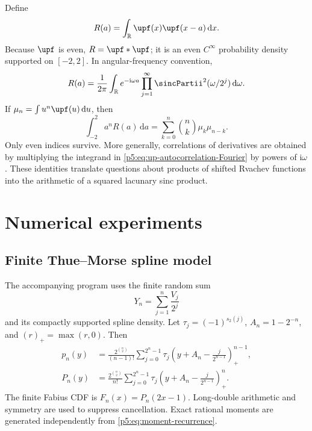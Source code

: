 \documentclass[11pt,oneside]{article}
\theoremstyle{definition}
\theoremstyle{remark}
\newcommand{\R}{\mathbb R}
\newcommand{\dd}{\,\mathrm d}
\newcommand{\ii}{\mathrm i}
\newcommand{\1}{\mathbf 1}
\begin{document}
Define
\begin{equation}\label{p5:eq:up-autocorrelation}
 R(a)=\int_{\R}\upf(x)\upf(x-a)\dd x.
\end{equation}
Because $\upf$ is even, $R=\upf*\upf$; it is an even $C^\infty$ probability density supported on $[-2,2]$.  In angular-frequency convention,
\begin{equation}\label{p5:eq:up-autocorrelation-Fourier}
 R(a)=\frac1{2\pi}\int_{\R}e^{-\ii\omega a}
 \prod_{j=1}^{\infty}\sincPartii^2(\omega/2^j)\dd\omega.
\end{equation}
If $\mu_n=\int u^n\upf(u)\dd u$, then
\begin{equation}\label{p5:eq:autocorrelation-moments}
 \int_{-2}^{2}a^nR(a)\dd a
 =\sum_{k=0}^n\binom nk\mu_k\mu_{n-k}.
\end{equation}
Only even indices survive.  More generally, correlations of derivatives are obtained by multiplying the integrand in \eqref{p5:eq:up-autocorrelation-Fourier} by powers of $\ii\omega$.  These identities translate questions about products of shifted Rvachev functions into the arithmetic of a squared lacunary sinc product.

\section{Numerical experiments}

\subsection{Finite Thue--Morse spline model}

The accompanying program uses the finite random sum
\begin{equation}
 Y_n=\sum_{j=1}^n\frac{V_j}{2^j}
\end{equation}
and its compactly supported spline density.  Let
$\tau_j=(-1)^{s_2(j)}$, $A_n=1-2^{-n}$, and $(r)_+=\max(r,0)$.  Then
\begin{align}
 p_n(y)&=\frac{2^{\binom n2}}{(n-1)!}
 \sum_{j=0}^{2^n-1}\tau_j
 \left(y+A_n-\frac{j}{2^{n-1}}\right)_+^{n-1},\label{p5:eq:finite-density}\\
 P_n(y)&=\frac{2^{\binom n2}}{n!}
 \sum_{j=0}^{2^n-1}\tau_j
 \left(y+A_n-\frac{j}{2^{n-1}}\right)_+^{n}.
 \label{p5:eq:finite-cdf}
\end{align}
The finite Fabius CDF is $F_n(x)=P_n(2x-1)$.  Long-double arithmetic and symmetry are used to suppress cancellation.  Exact rational moments are generated independently from \eqref{p5:eq:moment-recurrence}.
\end{document}
